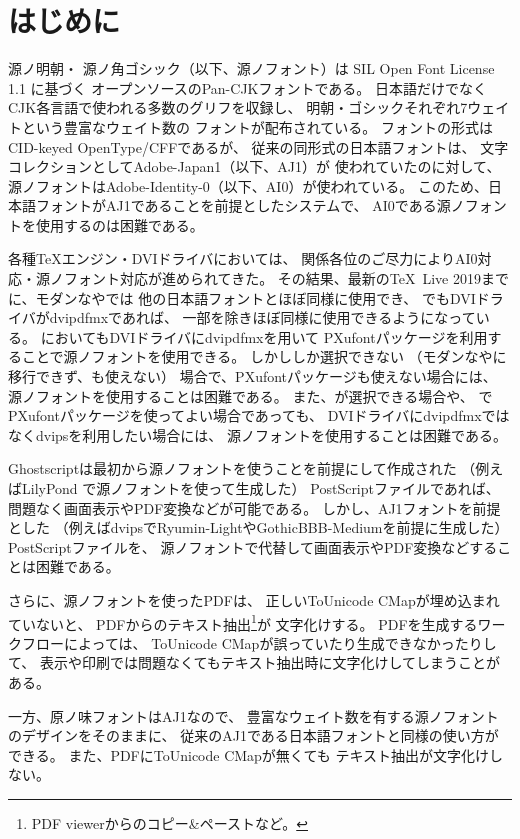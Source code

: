 \section{はじめに}

源ノ明朝\cite{sourcehanserif}・
源ノ角ゴシック\cite{sourcehansans}（以下、源ノフォント）は
SIL Open Font License 1.1 \cite{sil-ofl}に基づく
オープンソースのPan-CJKフォントである。
日本語だけでなくCJK各言語で使われる多数のグリフを収録し、
明朝・ゴシックそれぞれ7ウェイトという豊富なウェイト数の
フォントが配布されている。
フォントの形式はCID-keyed OpenType/CFFであるが、
従来の同形式の日本語フォントは、
文字コレクションとしてAdobe-Japan1（以下、AJ1）\cite{aj1}が
使われていたのに対して、
源ノフォントはAdobe-Identity-0（以下、AI0）が使われている。
このため、日本語フォントがAJ1であることを前提としたシステムで、
AI0である源ノフォントを使用するのは困難である。

各種\TeX エンジン・DVIドライバにおいては、
関係各位のご尽力によりAI0対応・源ノフォント対応が進められてきた。
その結果、最新の\TeX \ Live 2019までに、モダンな\LuaTeX や\XeTeX では
他の日本語フォントとほぼ同様に使用でき、
\upTeX でもDVIドライバがdvipdfmxであれば、
一部を除きほぼ同様に使用できるようになっている。
\pTeX においてもDVIドライバにdvipdfmxを用いて
PXufontパッケージ\cite{pxufont}を利用することで源ノフォントを使用できる。
しかし\pTeX しか選択できない
（モダンな\LuaTeX や\XeTeX に移行できず、\upTeX も使えない）
場合で、PXufontパッケージも使えない場合には、
源ノフォントを使用することは困難である。
また、\upTeX が選択できる場合や、
\pTeX でPXufontパッケージを使ってよい場合であっても、
DVIドライバにdvipdfmxではなくdvipsを利用したい場合には、
源ノフォントを使用することは困難である。

Ghostscriptは最初から源ノフォントを使うことを前提にして作成された
（例えばLilyPond \cite{lilypond}で源ノフォントを使って生成した）
PostScriptファイルであれば、問題なく画面表示やPDF変換などが可能である。
しかし、AJ1フォントを前提とした
（例えばdvipsでRyumin-LightやGothicBBB-Mediumを前提に生成した）
PostScriptファイルを、
源ノフォントで代替して画面表示やPDF変換などすることは困難である。

さらに、源ノフォントを使ったPDFは、
正しいToUnicode CMapが埋め込まれていないと、
PDFからのテキスト抽出\footnote{PDF viewerからのコピー\&ペーストなど。}が
文字化けする。
PDFを生成するワークフローによっては、
ToUnicode CMapが誤っていたり生成できなかったりして、
表示や印刷では問題なくてもテキスト抽出時に文字化けしてしまうことがある。

一方、原ノ味フォント\cite{haranoaji}はAJ1なので、
豊富なウェイト数を有する源ノフォントのデザインをそのままに、
従来のAJ1である日本語フォントと同様の使い方ができる。
また、PDFにToUnicode CMapが無くても
テキスト抽出が文字化けしない。

